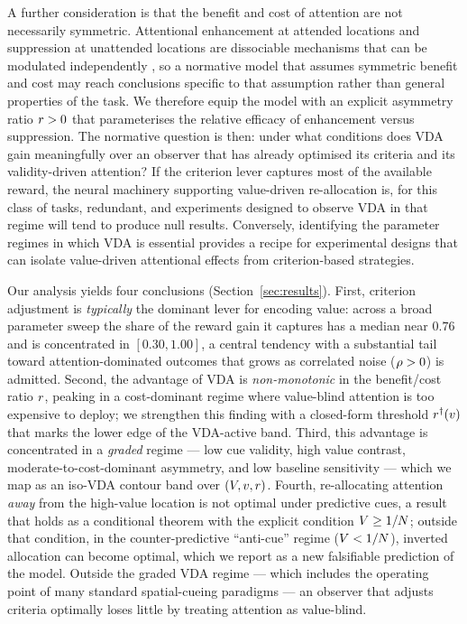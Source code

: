 A further consideration is that the benefit and cost of attention are
not necessarily symmetric. Attentional enhancement at attended locations
and suppression at unattended locations are dissociable mechanisms that
can be modulated independently
\cite{reynolds_heeger2009_normalization, treue_martinez_trujillo1999_feature_attention, mcadams_maunsell1999_v4_tuning},
so a normative model that assumes symmetric benefit and cost may reach
conclusions specific to that assumption rather than general properties
of the task. We therefore equip the model with an explicit asymmetry
ratio $r > 0$ that parameterises the relative efficacy of
enhancement versus suppression. The normative question is then: under
what conditions does VDA gain meaningfully over an observer that has
already optimised its criteria and its validity-driven attention? If
the criterion lever captures most of the available reward, the neural
machinery supporting value-driven re-allocation is, for this class of
tasks, redundant, and experiments designed to observe VDA in that regime
will tend to produce null results. Conversely, identifying the
parameter regimes in which VDA is essential provides a recipe for
experimental designs that can isolate value-driven attentional effects
from criterion-based strategies.

Our analysis yields four conclusions
(Section~\ref{sec:results}). First, criterion adjustment is
\emph{typically} the dominant lever for encoding value: across a broad
parameter sweep the share of the reward gain it captures has a median
near $0.76$ and is concentrated in $[0.30, 1.00]$, a central tendency
with a substantial tail toward attention-dominated outcomes that grows
as correlated noise ($\rho > 0$) is admitted. Second, the advantage of VDA is \emph{non-monotonic} in the
benefit/cost ratio $r$, peaking in a cost-dominant regime where
value-blind attention is too expensive to deploy; we strengthen this
finding with a closed-form threshold $r^{\dagger}(v)$ that marks the
lower edge of the VDA-active band. Third, this advantage is concentrated
in a \emph{graded} regime --- low cue validity, high value contrast,
moderate-to-cost-dominant asymmetry, and low baseline sensitivity ---
which we map as an iso-VDA contour band over $(V, v, r)$. Fourth, re-allocating
attention \emph{away} from the high-value location is not optimal under
predictive cues, a result that holds as a conditional theorem with the
explicit condition $V \ge 1/N$; outside that condition, in the
counter-predictive ``anti-cue'' regime ($V < 1/N$), inverted
allocation can become optimal, which we report as a new falsifiable
prediction of the model. Outside the graded VDA regime --- which
includes the operating point of many standard spatial-cueing paradigms
--- an observer that adjusts criteria optimally loses little by treating
attention as value-blind.
